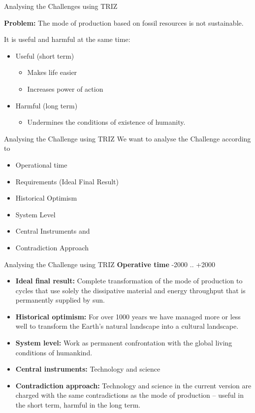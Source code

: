 \documentclass{beamer}
\begin{document}
\begin{frame}{Analysing the Challenges using TRIZ}
  
\textbf{Problem:} The mode of production based on fossil resources is not
sustainable.

It is useful and harmful at the same time:
\begin{itemize}
\item Useful (short term)
  \begin{itemize}
  \item Makes life easier
  \item Increases power of action
  \end{itemize}
\item Harmful (long term)
  \begin{itemize}
  \item Undermines the conditions of existence of humanity.
  \end{itemize}
\end{itemize}
\end{frame}

\begin{frame}{Analysing the Challenge using TRIZ}
We want to analyse the Challenge according to
\begin{itemize}
  \item Operational time
  \item Requirements (Ideal Final Result)
  \item Historical Optimism
  \item System Level
  \item Central Instruments and
  \item Contradiction Approach
\end{itemize}
\end{frame}

\begin{frame}{Analysing the Challenge using TRIZ}
  \textbf{Operative time} -2000 .. +2000
  \begin{itemize}
  \item \textbf{Ideal final result:} Complete transformation of the mode of
    production to cycles that use solely the dissipative material and energy
    throughput that is permanently supplied by sun.
  \item \textbf{Historical optimism:} For over 1000 years we have managed more
    or less well to transform the Earth's natural landscape into a cultural
    landscape.
  \item \textbf{System level:} Work as permanent confrontation with the global
    living conditions of humankind.
  \item \textbf{Central instruments:} Technology and science
  \item \textbf{Contradiction approach:} Technology and science in the current
    version are charged with the same contradictions as the mode of production
    -- useful in the short term, harmful in the long term.
  \end{itemize}
\end{frame}
\end{document}
